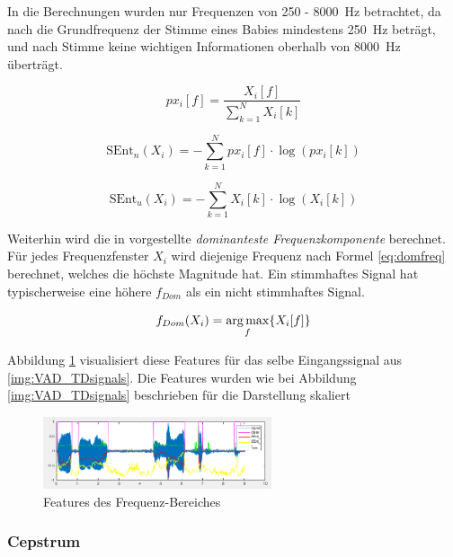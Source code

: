 In die Berechnungen wurden nur Frequenzen von 250 - \SI{8000}{\hertz} betrachtet, da nach \cite{lod} die Grundfrequenz der Stimme eines Babies mindestens \SI{250}{\hertz} beträgt, und nach \cite{vad_entropie02} Stimme keine wichtigen Informationen oberhalb von \SI{8000}{\hertz} überträgt.

\begin{equation}
px_i[f] = \frac{X_i[f]}{\sum_{k=1}^{N} X_i[k]}
\label{eq:norm_spek}
\end{equation}

\begin{equation}
\text{SEnt}_n(X_i) = -\sum_{k=1}^{N}px_i[f] \cdot\log(px_i[k])
\label{eq:norm_se}
\end{equation}

\begin{equation}
\text{SEnt}_u(X_i) = -\sum_{k=1}^{N}X_i[k] \cdot\log(X_i[k])
\label{eq:unnnorm_se}
\end{equation}

Weiterhin wird die in \cite{vad_Easy} vorgestellte \emph{dominanteste Frequenzkomponente} berechnet. Für jedes Frequenzfenster $X_i$ wird diejenige Frequenz nach Formel \ref{eq:domfreq} berechnet, welches die höchste Magnitude hat. Ein stimmhaftes Signal hat typischerweise eine höhere $f_{Dom}$ als ein nicht stimmhaftes Signal.

\begin{equation}
f_{Dom}(X_i) = \operatorname*{arg\,max}_f\{X_i[f]\}
\label{eq:domfreq}
\end{equation}

Abbildung \ref{img:VAD_FDsignals} visualisiert diese Features für das selbe Eingangssignal aus \ref{img:VAD_TDsignals}. Die Features wurden wie bei Abbildung \ref{img:VAD_TDsignals} beschrieben für die Darstellung skaliert

\begin{figure}[h]
	\centering
	\includegraphics[width=0.6\textwidth]{bilder/VAD_FDsignals.png}
	\caption{Features des Frequenz-Bereiches}
	\label{img:VAD_FDsignals}
\end{figure}

\subsubsection{Cepstrum}

